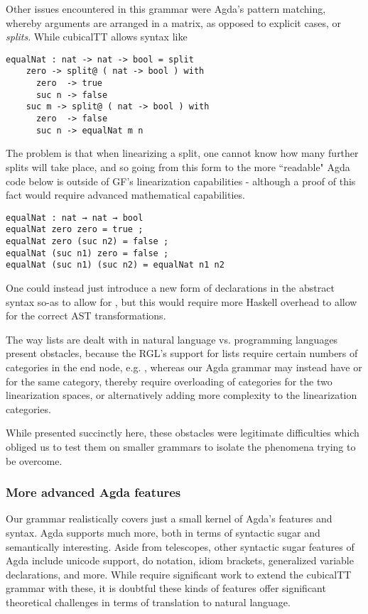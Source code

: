 Other issues encountered in this grammar were Agda's pattern matching, whereby
arguments are arranged in a matrix, as opposed to explicit cases, or \emph{splits}.
While cubicalTT allows syntax like

\begin{verbatim}
equalNat : nat -> nat -> bool = split
    zero -> split@ ( nat -> bool ) with
      zero  -> true
      suc n -> false
    suc m -> split@ ( nat -> bool ) with
      zero  -> false
      suc n -> equalNat m n
\end{verbatim}

The problem is that when linearizing a split, one cannot know how many further
splits will take place, and so going from this form to the more ``readable" Agda
code below is outside of GF's linearization capabilities - although a proof of
this fact would require advanced mathematical capabilities.

\begin{verbatim}
equalNat : nat → nat → bool
equalNat zero zero = true ; 
equalNat zero (suc n2) = false ;
equalNat (suc n1) zero = false ;
equalNat (suc n1) (suc n2) = equalNat n1 n2
\end{verbatim}

One could instead just introduce a new form of declarations in the abstract
syntax so-as to allow for , but this would require more Haskell
overhead to allow for the correct AST transformations. 

The way lists are dealt with in natural language vs. programming
languages present obstacles, because the RGL's support for lists require certain
numbers of categories in the end node, e.g. , whereas our Agda
grammar may instead have  or  for the same
category, thereby require overloading of categories for the two linearization
spaces, or alternatively adding more complexity to the linearization categories.

While presented succinctly here, these obstacles were legitimate difficulties
which obliged us to test them on smaller grammars to isolate the phenomena
trying to be overcome.

\subsubsection{More advanced Agda features}

Our grammar realistically covers just a small kernel of Agda's features and
syntax. Agda supports much more, both in terms of syntactic sugar and
semantically interesting. Aside from telescopes, other syntactic sugar features
of Agda include unicode support, do notation, idiom brackets, generalized
variable declarations, and more. While require significant work to extend the 
cubicalTT grammar with these, it is doubtful
these kinds of features offer significant theoretical challenges in terms of
translation to natural language.

